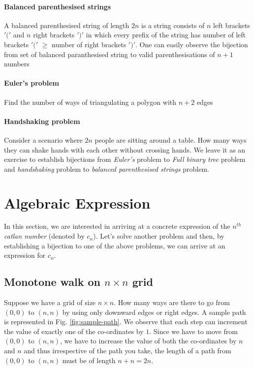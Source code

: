 \paragraph{Balanced parenthesised strings} A balanced parenthesised string of length $2n$ is a string consists of $n$ left brackets $'('$ and $n$ right brackets $')'$ in which every prefix of the string has number of left brackets $'('$ $\geq$ number of right brackets $')'$. One can easily observe the bijection from set of balanced paranthesised string to valid parenthesisations of $n+1$ numbers

\paragraph{Euler's problem} Find the number of ways of triangulating a polygon with $n+2$ edges

\paragraph{Handshaking problem} Consider a scenario where $2n$ people are sitting around a table. How many ways they can shake hands with each other without crossing hands. We leave it as an exercise to establish bijections from \emph{Euler's} problem to \emph{Full binary tree} problem and \emph{handshaking} problem to \emph{balanced parenthesised strings} problem.

\section{Algebraic Expression}
In this section, we are interested in arriving at a concrete expression of the $n^{th}$ \emph{catlan number} (denoted by $c_n$). Let's solve another problem and then, by establishing a bijection to one of the above problems, we can arrive at an expression for $c_n$.

\subsection{Monotone walk on $n\times n$ grid} Suppose we have a grid of size $n\times n$. How many ways are there to go from $(0,0)$ to $(n,n)$ by using only downward edges or right edges. A sample path is represented in Fig. \ref{fig:sample-path}. We observe that each step can increment the value of exactly one of the co-ordinates by $1$. Since we have to move from $(0,0)$ to $(n,n)$, we have to increase the value of both the co-ordinates by $n$ and $n$ and thus irrespective of the path you take, the length of a path from $(0,0)$ to $(n,n)$ must be of length $n+n=2n$.

